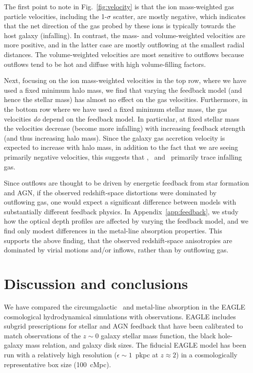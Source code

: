 \documentclass[useAMS,usenatbib,letterpaper]{mn2e}
\begin{document}
The first point to note in Fig.~\ref{fig:velocity} is that 
the ion mass-weighted gas particle velocities, 
including the 1-$\sigma$ scatter, are mostly negative, which indicates that the net direction
of the gas probed by these ions is typically towards the host galaxy (infalling).  
In contrast, the mass- and volume-weighted velocities are more positive, and in the latter case
are mostly outflowing at the smallest radial distances. The volume-weighted velocities 
are most sensitive to outflows because outflows tend to be hot and diffuse with high 
volume-filling factors.



Next, focusing on the ion mass-weighted velocities in the top row, where we have 
used a fixed minimum halo mass, 
we find that varying the feedback model (and hence the stellar mass) has almost no effect on the gas 
velocities. Furthermore, in the bottom row where we have used a fixed minimum stellar mass, the gas velocities 
\textit{do} depend on the feedback model. In particular, at fixed stellar mass the velocities decrease
(become more infalling) with increasing feedback strength (and thus increasing halo mass). 
Since the galaxy gas accretion velocity is expected to increase with halo mass, in addition to the fact that we 
are seeing primarily negative velocities, this suggests
that \hone, \cfour\ and \sifour\ primarily trace infalling gas. 


Since outflows are thought to be driven by energetic 
feedback from star formation and AGN, if the observed redshift-space distortions
were dominated by outflowing gas, one would expect a significant difference
between models with substantially different feedback physics. 
In Appendix~\ref{app:feedback}, we study how
the optical depth profiles are affected by varying the feedback model, and 
we find only modest differences in the metal-line 
absorption properties. This supports the above finding,
that the observed redshift-space anisotropies are dominated by 
virial motions and/or inflows, rather than by outflowing gas. 






\section{Discussion and conclusions}
\label{sec:conclusion}

We have compared the circumgalactic \hone\ and metal-line absorption
in the EAGLE cosmological hydrodynamical simulations with observations.
EAGLE includes subgrid prescriptions for stellar and AGN feedback
that have been calibrated to match observations of the $z\sim0$ galaxy stellar
mass function, the black hole-galaxy mass relation, and galaxy disk sizes.
The fiducial EAGLE model has been run 
with a relatively high resolution 
($\epsilon \sim 1$~pkpc at $z\approx2$)
in a cosmologically representative box size (100~cMpc).
\end{document}
